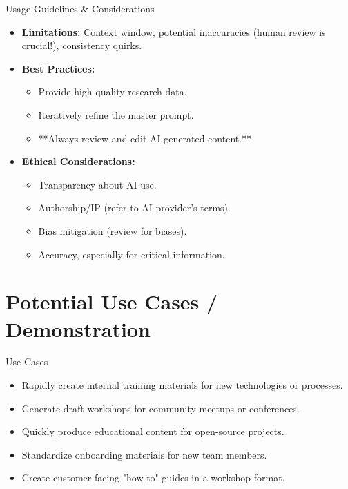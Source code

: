 \documentclass{beamer}
\begin{document}
\begin{frame}{Usage Guidelines & Considerations}
    \begin{itemize}
        \item \textbf{Limitations:} Context window, potential inaccuracies (human review is crucial!), consistency quirks.
        \item \textbf{Best Practices:}
            \begin{itemize}
                \item Provide high-quality research data.
                \item Iteratively refine the master prompt.
                \item **Always review and edit AI-generated content.**
            \end{itemize}
        \item \textbf{Ethical Considerations:}
            \begin{itemize}
                \item Transparency about AI use.
                \item Authorship/IP (refer to AI provider's terms).
                \item Bias mitigation (review for biases).
                \item Accuracy, especially for critical information.
            \end{itemize}
    \end{itemize}
\end{frame}

\section{Potential Use Cases / Demonstration} \label{L_section_usecases}

\begin{frame}{Use Cases}
    \begin{itemize}
        \item Rapidly create internal training materials for new technologies or processes.
        \item Generate draft workshops for community meetups or conferences.
        \item Quickly produce educational content for open-source projects.
        \item Standardize onboarding materials for new team members.
        \item Create customer-facing "how-to" guides in a workshop format.
    \end{itemize}
\end{frame}
\end{document}
